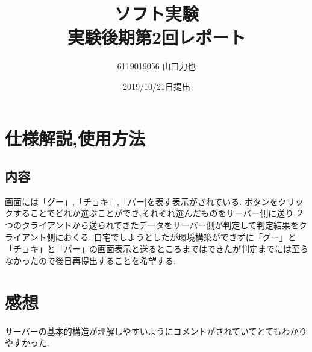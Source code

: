 \documentclass{jarticle}
\title{{ソフト実験}\\実験後期第2回レポート}
\author{6119019056 山口力也}
\date{2019/10/21日提出}
\begin{document}
\maketitle
\section{仕様解説,使用方法}
\subsection{内容}
画面には「グー」,「チョキ」,「パー]を表す表示がされている.
ボタンをクリックすることでどれか選ぶことができ,それぞれ選んだものをサーバー側に送り,２つのクライアントから送られてきたデータをサーバー側が判定して判定結果をクライアント側におくる.
自宅でしようとしたが環境構築ができずに「グー」と「チョキ」と「パー」の画面表示と送るところまではできたが判定までには至らなかったので後日再提出することを希望する.
\section{感想}
サーバーの基本的構造が理解しやすいようにコメントがされていてとてもわかりやすかった.
\end{document}

